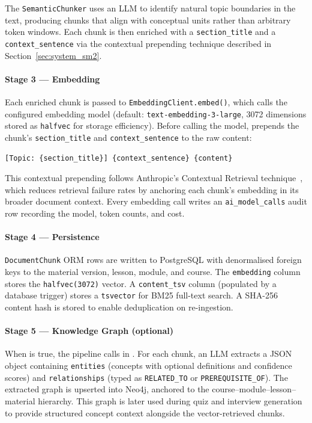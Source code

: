 The \texttt{SemanticChunker} uses an LLM to identify natural topic boundaries in the text, producing chunks that align with conceptual units rather than arbitrary token windows. Each chunk is then enriched with a \texttt{section\_title} and a \texttt{context\_sentence} via the contextual prepending technique described in Section~\ref{sec:system_sm2}.

\paragraph{Stage 3 — Embedding}
Each enriched chunk is passed to \texttt{EmbeddingClient.embed()}, which calls the configured embedding model (default: \texttt{text-embedding-3-large}, 3072 dimensions stored as \texttt{halfvec} for storage efficiency). Before calling the model,  prepends the chunk's \texttt{section\_title} and \texttt{context\_sentence} to the raw content:

\begin{verbatim}
[Topic: {section_title}] {context_sentence} {content}
\end{verbatim}

This contextual prepending follows Anthropic's Contextual Retrieval technique~\cite{anthropic2024contextual}, which reduces retrieval failure rates by anchoring each chunk's embedding in its broader document context. Every embedding call writes an \texttt{ai\_model\_calls} audit row recording the model, token counts, and cost.

\paragraph{Stage 4 — Persistence}
\texttt{DocumentChunk} ORM rows are written to PostgreSQL with denormalised foreign keys to the material version, lesson, module, and course. The \texttt{embedding} column stores the \texttt{halfvec(3072)} vector. A \texttt{content\_tsv} column (populated by a database trigger) stores a \texttt{tsvector} for BM25 full-text search. A SHA-256 content hash is stored to enable deduplication on re-ingestion.

\paragraph{Stage 5 — Knowledge Graph (optional)}
When  is true, the pipeline calls  in . For each chunk, an LLM extracts a JSON object containing \texttt{entities} (concepts with optional definitions and confidence scores) and \texttt{relationships} (typed as \texttt{RELATED\_TO} or \texttt{PREREQUISITE\_OF}). The extracted graph is upserted into Neo4j, anchored to the course–module–lesson–material hierarchy. This graph is later used during quiz and interview generation to provide structured concept context alongside the vector-retrieved chunks.

